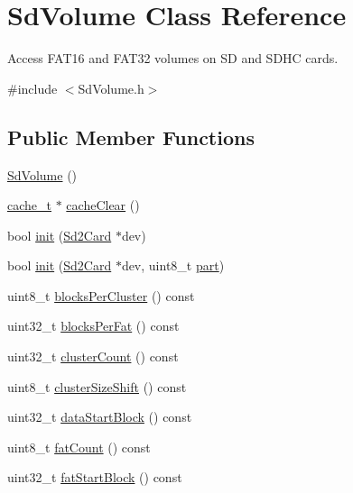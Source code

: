 \hypertarget{class_sd_volume}{\section{Sd\-Volume Class Reference}
\label{class_sd_volume}
}


Access F\-A\-T16 and F\-A\-T32 volumes on S\-D and S\-D\-H\-C cards.  




{\ttfamily \#include $<$Sd\-Volume.\-h$>$}

\subsection*{Public Member Functions}
\begin{DoxyCompactItemize}
\item 
\hyperlink{class_sd_volume_a8946a066e838455b790485f0f0b84a30}{Sd\-Volume} ()
\item 
\hyperlink{unioncache__t}{cache\-\_\-t} $\ast$ \hyperlink{class_sd_volume_aeb92f3b3c0e81e39f4dd123106f882a3}{cache\-Clear} ()
\item 
bool \hyperlink{class_sd_volume_ada2a0a79cd7ce879d8c6daf35ad86834}{init} (\hyperlink{class_sd2_card}{Sd2\-Card} $\ast$dev)
\item 
bool \hyperlink{class_sd_volume_af178086a8274ddf1346bed1a108622b3}{init} (\hyperlink{class_sd2_card}{Sd2\-Card} $\ast$dev, uint8\-\_\-t \hyperlink{_sd_fat_structs_8h_aa65f87792f271fc6cfa70980af6ac3dd}{part})
\item 
uint8\-\_\-t \hyperlink{class_sd_volume_a8e6f1dd240dc430fdd1caf9742a56a7e}{blocks\-Per\-Cluster} () const 
\item 
uint32\-\_\-t \hyperlink{class_sd_volume_aa3b929c0b3148bcef7622028d6978b8c}{blocks\-Per\-Fat} () const 
\item 
uint32\-\_\-t \hyperlink{class_sd_volume_afcf5e92320a02c89758f5b07f8426d53}{cluster\-Count} () const 
\item 
uint8\-\_\-t \hyperlink{class_sd_volume_aabed24c62fcedb89c4218b02c3763ae6}{cluster\-Size\-Shift} () const 
\item 
uint32\-\_\-t \hyperlink{class_sd_volume_ae95e3f4239d7ccb74d45a7e0cc4f499c}{data\-Start\-Block} () const 
\item 
uint8\-\_\-t \hyperlink{class_sd_volume_a01935bdcf6a336f292102f7f23a2a38f}{fat\-Count} () const 
\item 
uint32\-\_\-t \hyperlink{class_sd_volume_a1ff040834f446f329e00cc71284d92fc}{fat\-Start\-Block} () const 

\end{DoxyCompactItemize}
